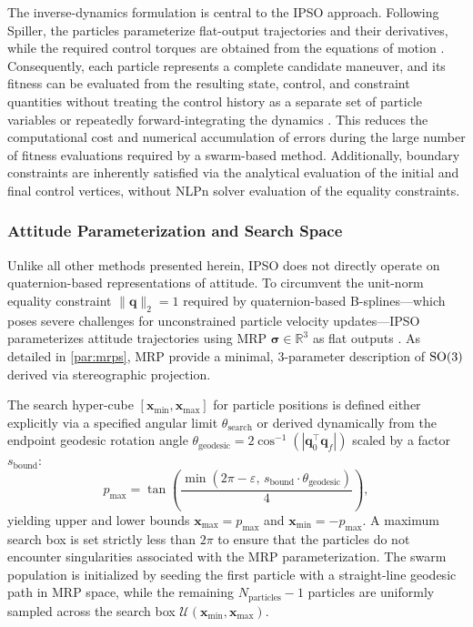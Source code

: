The inverse-dynamics formulation is central to the \ac{IPSO} approach. 
Following Spiller, the particles parameterize flat-output trajectories and their derivatives, while the required control torques are obtained from the equations of motion \cite{Spiller16,Spiller18}. 
Consequently, each particle represents a complete candidate maneuver, and its fitness can be evaluated from the resulting state, control, and constraint quantities without treating the control history as a separate set of particle variables or repeatedly forward-integrating the dynamics \cite{Spiller16,Spiller18}. 
This reduces the computational cost and numerical accumulation of errors during the large number of fitness evaluations required by a swarm-based method. 
Additionally, boundary constraints are inherently satisfied via the analytical evaluation of the initial and final control vertices, without \ac{NLPn} solver evaluation of the equality constraints.

\subsubsection{Attitude Parameterization and Search Space}
Unlike all other methods presented herein, \ac{IPSO} does not directly operate on quaternion-based representations of attitude.
To circumvent the unit-norm equality constraint $\|\mathbf{q}\|_2 = 1$ required by quaternion-based B-splines---which poses severe challenges for unconstrained particle velocity updates---\ac{IPSO} parameterizes attitude trajectories using \ac{MRP} $\boldsymbol{\sigma} \in \mathbb{R}^3$ as flat outputs \cite{Spiller16,Spiller18}.
As detailed in \cref{par:mrps}, \ac{MRP} provide a minimal, 3-parameter description of $\mathrm{SO}(3)$ derived via stereographic projection.

The search hyper-cube $[\mathbf{x}_{\min}, \mathbf{x}_{\max}]$ for particle positions is defined either explicitly via a specified angular limit $\theta_{\text{search}}$ or derived dynamically from the endpoint geodesic rotation angle $\theta_{\text{geodesic}} = 2 \cos^{-1}(|\mathbf{q}_0^\top \mathbf{q}_f|)$ scaled by a factor $s_{\text{bound}}$:
\begin{equation}
    p_{\max} = \tan\left( \frac{\min(2\pi - \varepsilon, \, s_{\text{bound}} \cdot \theta_{\text{geodesic}})}{4} \right),
\end{equation}
yielding upper and lower bounds $\mathbf{x}_{\max} = p_{\max}$ and $\mathbf{x}_{\min} = -p_{\max}$. 
A maximum search box is set strictly less than $2\pi$ to ensure that the particles do not encounter singularities associated with the \ac{MRP} parameterization.
The swarm population is initialized by seeding the first particle with a straight-line geodesic path in \ac{MRP} space, while the remaining $N_{\text{particles}} - 1$ particles are uniformly sampled across the search box $\mathcal{U}(\mathbf{x}_{\min}, \mathbf{x}_{\max})$.

